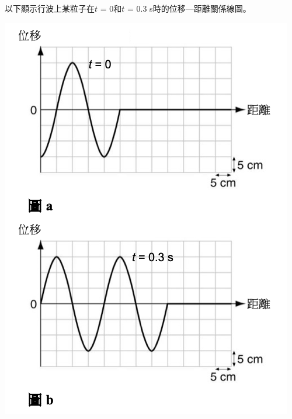 {
    以下顯示行波上某粒子在$t$ = 0和$t$ = 0.3 s時的位移—距離關係線圖。
    \par{\par\centering\includegraphics[width=.45\textwidth]{./img/ch1_earlyclass_wave_lq_2024-05-13-13-21-09.png}\par}
    }
